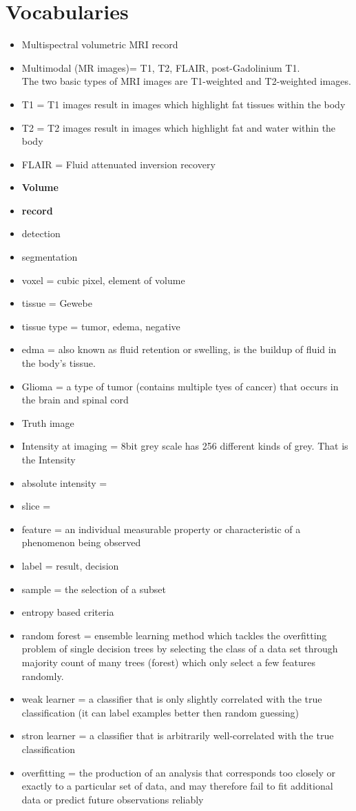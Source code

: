 \documentclass{article}
\begin{document}
\section{Vocabularies}

\begin{itemize}
    \item Multispectral volumetric MRI record
    \item Multimodal (MR images)= T1, T2, FLAIR, post-Gadolinium T1.\\
    The two basic types of MRI images are T1-weighted and T2-weighted images.
    \item T1 = T1 images result in images which highlight fat tissues within the body 
    \item T2 = T2 images result in images which highlight fat and water within the body
    \item FLAIR = Fluid attenuated inversion recovery
    \item \textbf{Volume}
    \item \textbf{record}
    \item detection 
    \item segmentation
    \item voxel = cubic pixel, element of volume
    \item tissue = Gewebe
    \item tissue type = tumor, edema, negative
    \item edma = also known as fluid retention or swelling, is the buildup of fluid in the body's tissue.
    \item Glioma = a type of tumor (contains multiple tyes of cancer) that occurs in the brain and spinal cord
    \item Truth image
    \item Intensity at imaging = 8bit grey scale has 256 different kinds of grey. That is the Intensity
    \item absolute intensity = 
    \item slice =
    \item feature = an individual measurable property or characteristic of a phenomenon being observed
    \item label = result, decision
    \item sample = the selection of a subset
    \item entropy based criteria
    \item random forest = ensemble learning method which tackles the overfitting problem of single decision trees by selecting the class of a data set through majority count of many trees (forest) which only select a few features randomly. 
    \item weak learner = a classifier that is only slightly correlated with the true classification (it can label examples better then random guessing)
    \item stron learner = a classifier that is arbitrarily well-correlated with the true classification
    \item overfitting = the production of an analysis that corresponds too closely or exactly to a particular set of data, and may therefore fail to fit additional data or predict future observations reliably
\end{itemize}
\end{document}
